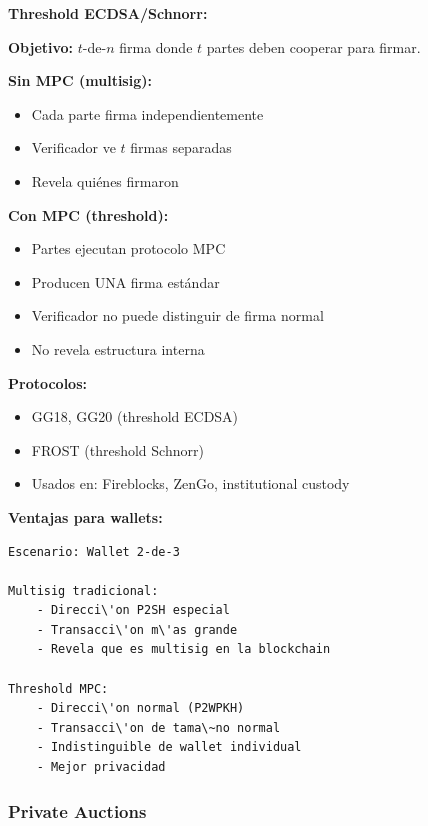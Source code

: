 \documentclass[11pt,a4paper,twoside]{book}
\begin{document}
\begin{mathnote}
\textbf{Threshold ECDSA/Schnorr:}

\textbf{Objetivo:} $t$-de-$n$ firma donde $t$ partes deben cooperar para firmar.

\textbf{Sin MPC (multisig):}
\begin{itemize}
    \item Cada parte firma independientemente
    \item Verificador ve $t$ firmas separadas
    \item Revela qui\'enes firmaron
\end{itemize}

\textbf{Con MPC (threshold):}
\begin{itemize}
    \item Partes ejecutan protocolo MPC
    \item Producen UNA firma est\'andar
    \item Verificador no puede distinguir de firma normal
    \item No revela estructura interna
\end{itemize}

\textbf{Protocolos:}
\begin{itemize}
    \item GG18, GG20 (threshold ECDSA)
    \item FROST (threshold Schnorr)
    \item Usados en: Fireblocks, ZenGo, institutional custody
\end{itemize}

\textbf{Ventajas para wallets:}
\begin{verbatim}
Escenario: Wallet 2-de-3

Multisig tradicional:
    - Direcci\'on P2SH especial
    - Transacci\'on m\'as grande
    - Revela que es multisig en la blockchain

Threshold MPC:
    - Direcci\'on normal (P2WPKH)
    - Transacci\'on de tama\~no normal
    - Indistinguible de wallet individual
    - Mejor privacidad
\end{verbatim}
\end{mathnote}

\subsubsection{Private Auctions}
\end{document}
